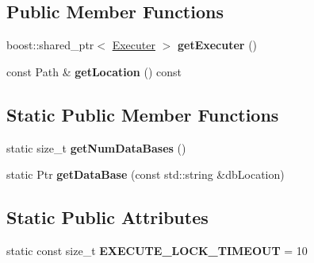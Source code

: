 \subsection*{Public Member Functions}
\begin{DoxyCompactItemize}
\item 
\hypertarget{classsambag_1_1cpsqlite_1_1_data_base_adf84d716bd37733172e8880d54397efc}{
boost::shared\_\-ptr$<$ \hyperlink{classsambag_1_1cpsqlite_1_1_data_base_1_1_executer}{Executer} $>$ {\bfseries getExecuter} ()}
\label{classsambag_1_1cpsqlite_1_1_data_base_adf84d716bd37733172e8880d54397efc}

\item 
\hypertarget{classsambag_1_1cpsqlite_1_1_data_base_a054fa83d4305cd92194f2ce02e88bfb6}{
const Path \& {\bfseries getLocation} () const }
\label{classsambag_1_1cpsqlite_1_1_data_base_a054fa83d4305cd92194f2ce02e88bfb6}

\end{DoxyCompactItemize}
\subsection*{Static Public Member Functions}
\begin{DoxyCompactItemize}
\item 
\hypertarget{classsambag_1_1cpsqlite_1_1_data_base_aaedf91912c3e1d61b31db295259a7253}{
static size\_\-t {\bfseries getNumDataBases} ()}
\label{classsambag_1_1cpsqlite_1_1_data_base_aaedf91912c3e1d61b31db295259a7253}

\item 
\hypertarget{classsambag_1_1cpsqlite_1_1_data_base_ace4c1a3168bb95df382b3b478e0b8397}{
static Ptr {\bfseries getDataBase} (const std::string \&dbLocation)}
\label{classsambag_1_1cpsqlite_1_1_data_base_ace4c1a3168bb95df382b3b478e0b8397}

\end{DoxyCompactItemize}
\subsection*{Static Public Attributes}
\begin{DoxyCompactItemize}
\item 
\hypertarget{classsambag_1_1cpsqlite_1_1_data_base_a5beb5a04609fc43ea07692d46399a094}{
static const size\_\-t {\bfseries EXECUTE\_\-LOCK\_\-TIMEOUT} = 10}
\label{classsambag_1_1cpsqlite_1_1_data_base_a5beb5a04609fc43ea07692d46399a094}

\end{DoxyCompactItemize}


